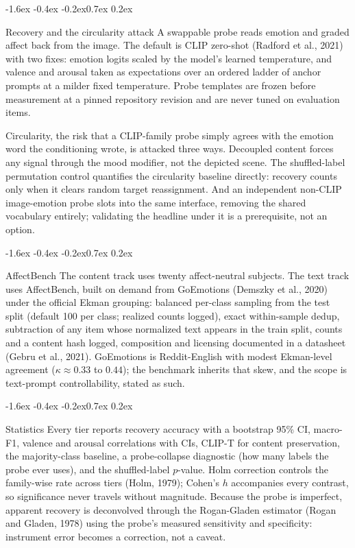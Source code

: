 \documentclass[10pt]{article}
\makeatletter
\renewcommand\subsection{\@startsection{subsection}{2}{\z@}%
  {-1.6ex \@plus -0.4ex \@minus -0.2ex}{0.7ex \@plus 0.2ex}{\normalsize\bfseries\raggedright}}
\makeatother
\begin{document}
\subsection{Recovery and the circularity attack}
A swappable probe reads emotion and graded affect back from the image. The default is CLIP zero-shot (Radford et al., 2021) with two fixes: emotion logits scaled by the model's learned temperature, and valence and arousal taken as expectations over an ordered ladder of anchor prompts at a milder fixed temperature. Probe templates are frozen before measurement at a pinned repository revision and are never tuned on evaluation items.

Circularity, the risk that a CLIP-family probe simply agrees with the emotion word the conditioning wrote, is attacked three ways. Decoupled content forces any signal through the mood modifier, not the depicted scene. The shuffled-label permutation control quantifies the circularity baseline directly: recovery counts only when it clears random target reassignment. And an independent non-CLIP image-emotion probe slots into the same interface, removing the shared vocabulary entirely; validating the headline under it is a prerequisite, not an option.

\subsection{AffectBench}
The content track uses twenty affect-neutral subjects. The text track uses AffectBench, built on demand from GoEmotions (Demszky et al., 2020) under the official Ekman grouping: balanced per-class sampling from the test split (default 100 per class; realized counts logged), exact within-sample dedup, subtraction of any item whose normalized text appears in the train split, counts and a content hash logged, composition and licensing documented in a datasheet (Gebru et al., 2021). GoEmotions is Reddit-English with modest Ekman-level agreement ($\kappa \approx 0.33$ to $0.44$); the benchmark inherits that skew, and the scope is text-prompt controllability, stated as such.

\subsection{Statistics}
Every tier reports recovery accuracy with a bootstrap 95\% CI, macro-F1, valence and arousal correlations with CIs, CLIP-T for content preservation, the majority-class baseline, a probe-collapse diagnostic (how many labels the probe ever uses), and the shuffled-label $p$-value. Holm correction controls the family-wise rate across tiers (Holm, 1979); Cohen's $h$ accompanies every contrast, so significance never travels without magnitude. Because the probe is imperfect, apparent recovery is deconvolved through the Rogan-Gladen estimator (Rogan and Gladen, 1978) using the probe's measured sensitivity and specificity: instrument error becomes a correction, not a caveat.
\end{document}
